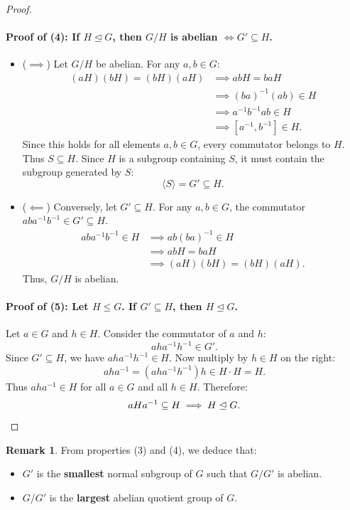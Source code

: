 \documentclass[12pt]{article}
\theoremstyle{definition}
\newtheorem*{remark}{Remark}
\theoremstyle{plain}
\begin{document}
\begin{proof}
\paragraph{Proof of (4): If $H \trianglelefteq G$, then $G/H$ is abelian $\iff G' \subseteq H$.}
\begin{itemize}
    \item ($\implies$) Let $G/H$ be abelian.
    For any $a, b \in G$:
    \begin{align*}
    (a H)(b H) = (b H)(a H) &\implies a b H = b a H \\
    &\implies (b a)^{-1} (a b) \in H \\
    &\implies a^{-1} b^{-1} a b \in H \\
    &\implies [a^{-1}, b^{-1}] \in H.
    \end{align*}
    Since this holds for all elements $a, b \in G$, every commutator belongs to $H$.
    Thus $S \subseteq H$. Since $H$ is a subgroup containing $S$, it must contain the subgroup generated by $S$:
    \[
    \langle S \rangle = G' \subseteq H.
    \]
    
    \item ($\impliedby$) Conversely, let $G' \subseteq H$.
    For any $a, b \in G$, the commutator $a b a^{-1} b^{-1} \in G' \subseteq H$.
    \begin{align*}
    a b a^{-1} b^{-1} \in H &\implies a b (b a)^{-1} \in H \\
    &\implies a b H = b a H \\
    &\implies (a H)(b H) = (b H)(a H).
    \end{align*}
    Thus, $G/H$ is abelian.
\end{itemize}

\paragraph{Proof of (5): Let $H \le G$. If $G' \subseteq H$, then $H \trianglelefteq G$.}
Let $a \in G$ and $h \in H$.
Consider the commutator of $a$ and $h$:
\[
a h a^{-1} h^{-1} \in G'.
\]
Since $G' \subseteq H$, we have $a h a^{-1} h^{-1} \in H$.
Now multiply by $h \in H$ on the right:
\[
a h a^{-1} = (a h a^{-1} h^{-1}) h \in H \cdot H = H.
\]
Thus $a h a^{-1} \in H$ for all $a \in G$ and all $h \in H$.
Therefore:
\[
a H a^{-1} \subseteq H \implies H \trianglelefteq G. \qedhere
\]
\end{proof}

\begin{remark}
From properties (3) and (4), we deduce that:
\begin{itemize}
    \item $G'$ is the \textbf{smallest} normal subgroup of $G$ such that $G/G'$ is abelian.
    \item $G/G'$ is the \textbf{largest} abelian quotient group of $G$.
\end{itemize}
\end{remark}
\end{document}
